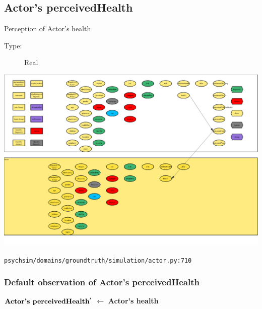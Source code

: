 \documentclass{article}%
\begin{document}
\subsection{Actor's perceivedHealth}%
\label{subsec:Actor's perceivedHealth}%
Perception of Actor's health%
\begin{description}%
\item[Type:]%
Real%
\end{description}%
\includegraphics[width=\textwidth]{images/perceivedHealthOfActor.png}%
\begin{flushleft}%
\verb|psychsim/domains/groundtruth/simulation/actor.py:710|%
\end{flushleft}%
\subsubsection{Default observation of Actor's perceivedHealth}%
\label{ssubsec:Default observation of Actor's perceivedHealth}%
\begin{flushleft}%
$\mbox{\textbf{Actor's perceivedHealth}} '$%
$\leftarrow$%
\textbf{Actor's health}%
\end{flushleft}

%
\end{document}
